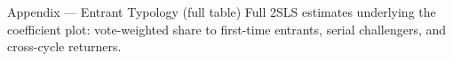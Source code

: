 
\begin{frame}{Appendix --- Entrant Typology (full table)}
\hypertarget{app:entrant}{}
\small
Full 2SLS estimates underlying the coefficient plot: vote-weighted share to first-time entrants, serial challengers, and cross-cycle returners.
\smallskip
\begin{center}
\scriptsize
\resizebox{\linewidth}{!}{}
\end{center}
\smallskip
\footnotesize \hfill\hyperlink{src:entrant}{}
\end{frame}
